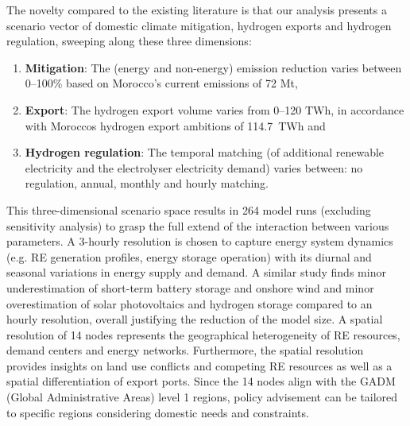 The novelty compared to the existing literature is that
our analysis presents a scenario vector of domestic climate mitigation, hydrogen exports and hydrogen regulation, sweeping along these three dimensions:
\begin{enumerate}
    \item \textbf{Mitigation}: The (energy and non-energy) emission reduction varies between 0--100\% based on Morocco's current emissions of 72 Mt\coe,
    \item \textbf{Export}: The hydrogen export volume varies from 0--120 TWh, in accordance with Moroccos hydrogen export ambitions of 114.7~TWh and
    \item \textbf{Hydrogen regulation}: The temporal matching (of additional renewable electricity and the electrolyser electricity demand) varies between: no regulation, annual, monthly and hourly matching.
\end{enumerate}
This three-dimensional scenario space results in 264 model runs (excluding sensitivity analysis) to grasp the full extend of the interaction between various parameters.
A 3-hourly resolution is chosen to capture energy system dynamics (e.g. RE generation profiles, energy storage operation) with its diurnal and seasonal variations in energy supply and demand. A similar study \cite{Neumann2022} finds minor underestimation of short-term battery storage and onshore wind and minor overestimation of solar photovoltaics and hydrogen storage compared to an hourly resolution, overall justifying the reduction of the model size. 
A spatial resolution of 14 nodes represents the geographical heterogeneity of RE resources, demand centers and energy networks. Furthermore, the spatial resolution provides insights on land use conflicts and competing RE resources as well as a spatial differentiation of export ports. Since the 14 nodes align with the GADM (Global Administrative Areas) level 1 regions, policy advisement can be tailored to specific regions considering domestic needs and constraints.



